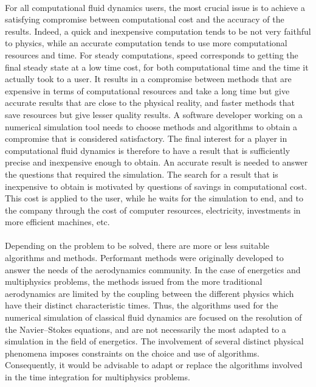     \paragraph{}
    For all computational fluid dynamics users, the most crucial issue is to achieve a satisfying compromise between computational cost and the accuracy of the results.
    Indeed, a quick and inexpensive computation tends to be not very faithful to physics, while an accurate computation tends to use more computational resources and time.
    For steady computations, speed corresponds to getting the final steady state at a low time cost, for both computational time and the time it actually took to a user.
    It results in a compromise between methods that are expensive in terms of computational resources and take a long time but give accurate results that are close to the physical reality, and faster methods that save resources but give lesser quality results.
    A software developer working on a numerical simulation tool needs to choose methods and algorithms to obtain a compromise that is considered satisfactory.
    The final interest for a player in computational fluid dynamics is therefore to have a result that is sufficiently precise and inexpensive enough to obtain.
    An accurate result is needed to answer the questions that required the simulation.
    The search for a result that is inexpensive to obtain is motivated by questions of savings in computational cost.
    This cost is applied to the user, while he waits for the simulation to end, and to the company through the cost of computer resources, electricity, investments in more efficient machines, etc.

    \paragraph{}
    Depending on the problem to be solved, there are more or less suitable algorithms and methods.
    Performant methods were originally developed to answer the needs of the aerodynamics community.
    In the case of energetics and multiphysics problems, the methods issued from the more traditional aerodynamics are limited by the coupling  between the different physics which have their distinct characteristic times.
    Thus, the algorithms used for the numerical simulation of classical fluid dynamics are focused on the resolution of the Navier--Stokes equations, and are not necessarily the most adapted to a simulation in the field of energetics.
    The involvement of several distinct physical phenomena imposes constraints on the choice and use of algorithms.
    Consequently, it would be advisable to adapt or replace the algorithms involved in the time integration for multiphysics problems.


